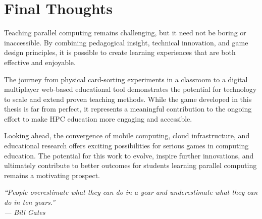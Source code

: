\section{Final Thoughts}
\label{sec:final-thoughts}

Teaching parallel computing remains challenging, but it need not be boring or inaccessible. By combining pedagogical insight, technical innovation, and game design principles, it is possible to create learning experiences that are both effective and enjoyable.

The journey from physical card-sorting experiments in a classroom to a digital multiplayer web-based educational tool demonstrates the potential for technology to scale and extend proven teaching methods. While the game developed in this thesis is far from perfect, it represents a meaningful contribution to the ongoing effort to make HPC education more engaging and accessible.

Looking ahead, the convergence of mobile computing, cloud infrastructure, and educational research offers exciting possibilities for serious games in computing education. The potential for this work to evolve, inspire further innovations, and ultimately contribute to better outcomes for students learning parallel computing remains a motivating prospect.

\vspace{1cm}

\begin{center}
    \textit{``People overestimate what they can do in a year and underestimate what they can do in ten years.''}\\
    \textit{— Bill Gates}
\end{center}

